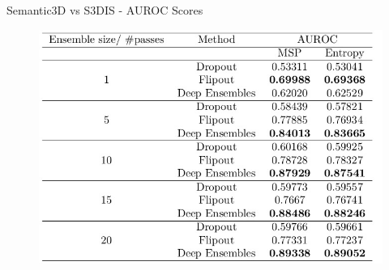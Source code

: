 \documentclass[aspectratio=169]{beamer}
\begin{document}
\begin{frame}{Semantic3D vs S3DIS - AUROC Scores}
            \begin{figure}
                \centering
                \includegraphics[scale=.33]{images/ood1/AUROC_OOD1_Scores.jpg}
            \end{figure}   
            \begin{table}
                \caption{AUROC scores calculated for all the points in the test sets of Semantic3D and S3DIS for
                Dropout, Flipout, and Deep Ensembles generated using MSP and entropy values for various ensemble
                sizes and forward passes.}
            \end{table}
\end{frame}
\end{document}
